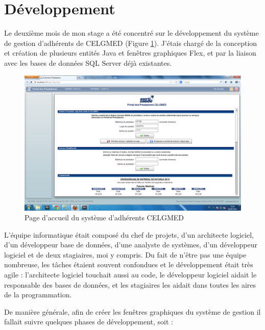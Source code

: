 \section{Développement}


Le deuxième mois de mon stage a été concentré sur le développement du système de gestion d'adhérents de CELGMED (Figure \ref{pp}). J'étais chargé de la conception et création de plusieurs entités Java et fenêtres graphiques Flex, et par la liaison avec les bases de données SQL Server déjà existantes.

\begin{figure}[h]
\begin{center}
    \includegraphics[scale=0.39]{img/pp}
    \caption{Page d'accueil du système d'adhérents CELGMED}
	\label{pp}
\end{center}
\end{figure}

L'équipe informatique était composé du chef de projets, d'un architecte logiciel, d'un développeur base de données, d'une analyste de systèmes, d'un développeur logiciel et de deux stagiaires, moi y compris. Du fait de n'être pas une équipe nombreuse, les tâches étaient souvent confondues et le développement était très agile : l'architecte logiciel touchait aussi au code, le développeur logiciel aidait le responsable des bases de données, et les stagiaires les aidait dans toutes les aires de la programmation.

De manière générale, afin de créer les fenêtres graphiques du système de gestion il fallait suivre quelques phases de développement, soit :

